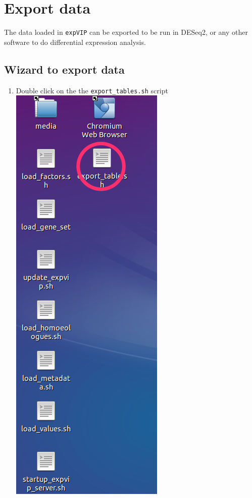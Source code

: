 \section{Export data}\label{export-data}

The data loaded in \lstinline!expVIP! can be exported to be run in
DESeq2, or any other software to do differential expression analysis.

\subsection{Wizard to export data}\label{wizard-to-export-data}

\begin{enumerate}
\def\labelenumi{\arabic{enumi}.}
\itemsep1pt\parskip0pt
\item
  Double click on the the \lstinline!export_tables.sh! script
  \includegraphics{images/ExportData01.png}

\end{enumerate}
